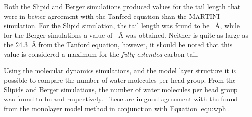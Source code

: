 \documentclass[amsmath,amssymb,twocolumn,superscriptaddress]{revtex4-1}
\begin{document}
Both the Slipid and Berger simulations produced values for the tail length that were in better agreement with the Tanford equation than the MARTINI simulation.
For the Slipid simulation, the tail length was found to be ~\si{\angstrom}, while for the Berger simulations a value of ~\si{\angstrom} was obtained.
Neither is quite as large as the \SI{24.3}{\angstrom} from the Tanford equation, however, it should be noted that this value is considered a maximum for the \emph{fully extended} carbon tail.

Using the molecular dynamics simulations, and the model layer structure it is possible to compare the number of water molecules per head group.
From the Slipids and Berger simulations, the number of water molecules per head group was found to be  and  respectively.
These are in good agreement with the  found from the monolayer model method in conjunction with Equation \ref{equ:wph}.
\end{document}
